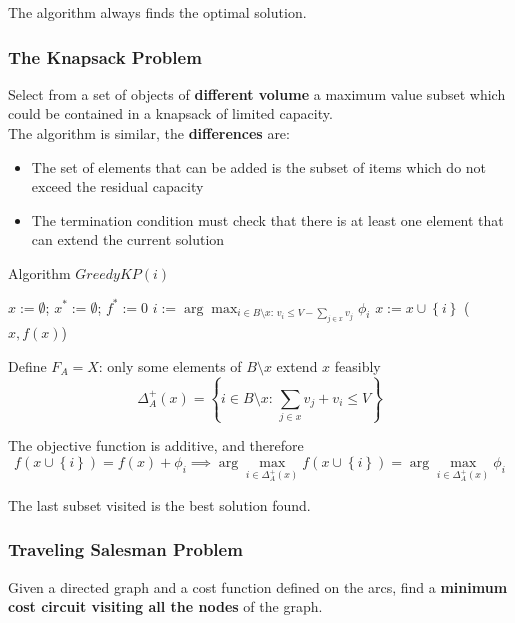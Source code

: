 The algorithm always finds the optimal solution.\\

\newpage

\subsubsection{The Knapsack Problem} 
Select from a set of objects of \textbf{different volume} a maximum value subset which could be contained in a knapsack of limited capacity.\\

The algorithm is similar, the \textbf{differences} are:
\begin{itemize}
	\item The set of elements that can be added is the subset of items which do not exceed the residual capacity
	
	\item The termination condition must check that there is at least one element that can extend the current solution
\end{itemize}

\begin{algorithm}
	\caption{Algorithm $GreedyKP(i)$}
	\begin{algorithmic}
		\STATE $x := \emptyset$; $x^\ast := \emptyset$; $f^\ast := 0$
		\STATE $i := \arg \max_{i \in B \setminus x : \, v_i \leq V - \sum_{j \in x} v_j} \phi_i$
		\STATE $x := x \cup \left\{i\right\}$
		\ENDWHILE
		\RETURN ($x, f(x)$)
	\end{algorithmic}
\end{algorithm}

Define $F_A = X$: only some elements of $B \setminus x$ extend $x$ feasibly
$$ \Delta_A^+ (x) = \left\{i \in B \setminus x: \, \sum_{j \in x} v_j + v_i \leq V \right\} $$

The objective function is additive, and therefore
$$ f\left(x \cup \left\{i\right\}\right) = f(x) + \phi_i \implies \arg \max_{i \in \Delta_A^+ (x)} f\left(x \cup \left\{i\right\}\right) = \arg \max_{i \in \Delta_A^+ (x)} \phi_i $$

The last subset visited is the best solution found.\\

\newpage

\subsubsection{Traveling Salesman Problem}
Given a directed graph and a cost function defined on the arcs, find a \textbf{minimum cost circuit visiting all the nodes} of the graph.\\

